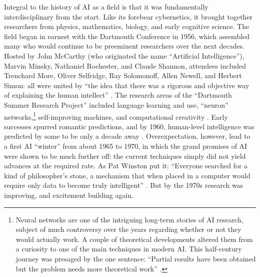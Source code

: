 Integral to the history of AI as a field is that it was fundamentally
interdisciplinary from the start. Like its forebear cybernetics, it
brought together researchers from physics, mathematics, biology, and
early cognitive science. The field began in earnest with the Dartmouth
Conference in 1956, which assembled many who would continue to
be preeminent researchers over the next decades. Hosted by John
McCarthy (who originated the name
``Artificial Intelligence''), Marvin Minsky, Nathaniel Rochester, and
Claude Shannon, attendees included Trenchard More, Oliver Selfridge,
Ray Solomonoff, Allen Newell, and Herbert Simon: all were united by
``the idea that there was a rigorous and objective way of explaining
the human intellect'' \cite[Ch. 5]{mccorduck}. The research areas of
the ``Dartmouth Summer Research Project'' included language learning
and use, ``neuron'' networks,\footnote{Neural networks are one of the
  intriguing long-term stories of AI research, subject of much
  controversy over the years regarding whether or not they would
  actually work. A couple of theoretical developments altered them
  from a curiosity to one of the main techniques in modern AI. This
  half-century journey was presaged by the one sentence: ``Partial
  results have been obtained but the problem needs more theoretical
  work'' \cite{dartmouthconf}.} self-improving machines, and computational 
creativity \cite{dartmouthconf}. Early successes spurred romantic
predictions, and by 1960, human-level intelligence was predicted by
some to be only a decade away \cite[p. 3]{winston}. Overexpectation, however,
lead to a first AI ``winter'' from about 1965 to 1970, in which the
grand promises of AI were shown to be much further off: the current
techniques simply did not yield advances at the required rate. As Pat
Winston put it: ``Everyone searched for a kind of philosopher's stone,
a mechanism that when placed in a computer would require only data to
become truly intelligent'' \cite[p. 4]{winston}. But by the 1970s
research was improving, and excitement building again.


